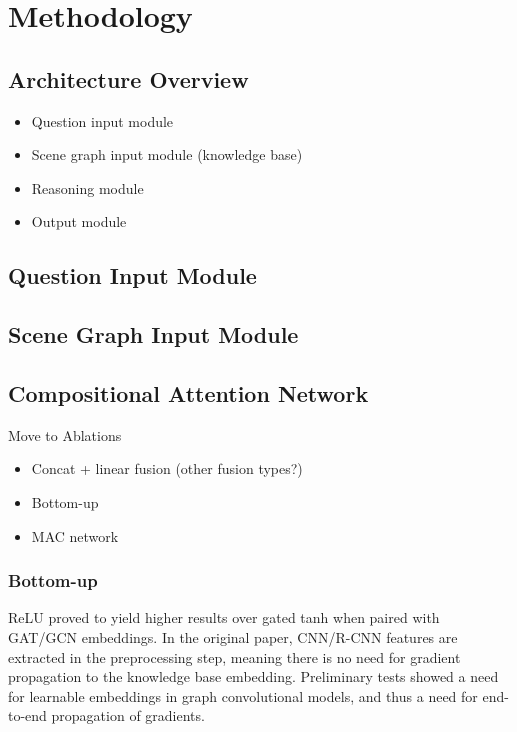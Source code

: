 \chapter{Methodology}
\label{chapter:methodology}

\section{Architecture Overview}
\label{section:architecture_overview}

\begin{itemize}
  \item Question input module
  \item Scene graph input module (knowledge base)
  \item Reasoning module
  \item Output module
\end{itemize}

\section{Question Input Module}
\label{section:question_input_module}

\section{Scene Graph Input Module}
\label{section:scene_graph_input_module}

\section{Compositional Attention Network}
\label{section:compositional_attention_network}

{\color{red}

Move to Ablations

\begin{itemize}
  \item Concat + linear fusion (other fusion types?)
  \item Bottom-up
  \item MAC network
\end{itemize}

\subsection{Bottom-up}
\label{subsection:bottom_up}
 ReLU proved to yield higher results over gated tanh when paired with GAT/GCN embeddings. In the original paper, CNN/R-CNN features are extracted in the preprocessing step, meaning there is no need for gradient propagation to the knowledge base embedding. Preliminary tests showed a need for learnable embeddings in graph convolutional models, and thus a need for end-to-end propagation of gradients.}


